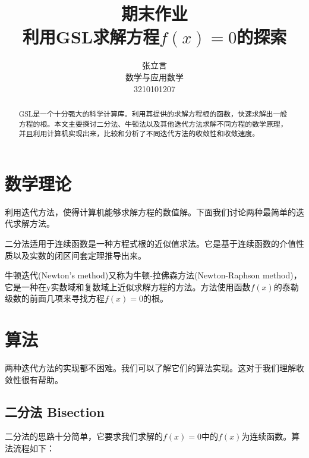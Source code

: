 \documentclass{ctexart}
\begin{document}
\pagestyle{empty}

\title{期末作业\\利用GSL求解方程$f(x)=0$的探索}
\author{张立言\\数学与应用数学\\3210101207}
\maketitle

\begin{abstract}
GSL是一个十分强大的科学计算库。利用其提供的求解方程根的函数，快速求解出一般方程的根。本文主要探讨二分法、牛顿法以及其他迭代方法求解不同方程的数学原理，并且利用计算机实现出来，比较和分析了不同迭代方法的收敛性和收敛速度。
\end{abstract}
\section{数学理论}
利用迭代方法，使得计算机能够求解方程的数值解。下面我们讨论两种最简单的迭代求解方法。

二分法适用于连续函数是一种方程式根的近似值求法。它是基于连续函数的介值性质以及实数的闭区间套定理推导出来。

牛顿迭代(Newton's method)又称为牛顿-拉佛森方法(Newton-Raphson method)，它是一种在y实数域和复数域上近似求解方程的方法。方法使用函数$f(x)$的泰勒级数的前面几项来寻找方程$f(x)=0$的根。

\section{算法}
两种迭代方法的实现都不困难。我们可以了解它们的算法实现。这对于我们理解收敛性很有帮助。
\subsection{二分法 Bisection}
二分法的思路十分简单，它要求我们求解的$f(x)=0$中的$f(x)$为连续函数。算法流程如下：
\end{document}
